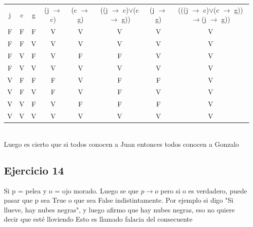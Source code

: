 		\begin{tabular}{c|c|c|c|c|c|c|c}
			j & c & g & (j $\rightarrow$ c) & (c $\rightarrow$ g) & ((j $\rightarrow$ c)$\vee$(c $\rightarrow$ g)) & (j $\rightarrow$ g) & (((j $\rightarrow$ c)$\vee$(c $\rightarrow$ g))$\rightarrow$(j $\rightarrow$ g)) \\
			F          & F          & F          & V              & V              & V                          & V              & V                                      \\
			F          & F          & V          & V              & V              & V                          & V              & V                                      \\
			F          & V          & F          & V              & F              & F                          & V              & V                                      \\
			F          & V          & V          & V              & V              & V                          & V              & V                                      \\
			V          & F          & F          & F              & V              & F                          & F              & V                                      \\
			V          & F          & V          & F              & V              & F                          & V              & V                                      \\
			V          & V          & F          & V              & F              & F                          & F              & V                                      \\
			V          & V          & V          & V              & V              & V                          & V              & V                                     
		\end{tabular}\\
		Luego es cierto que si todos conocen a Juan entonces todos conocen a Gonzalo
	
	\subsection{Ejercicio 14}
		Si p = pelea y o = ojo morado. Luego se que $p \rightarrow o$ pero si o es verdadero, puede pasar que p sea True o que sea False indistintamente. Por ejemplo si digo "Si llueve, hay nubes negras", y luego afirmo que hay nubes negras, eso no quiere decir que esté lloviendo
		Esto es llamado falacia del consecuente
		

